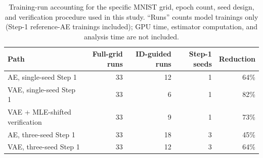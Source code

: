 \documentclass[make,article,submit,pdftex,moreauthors]{Definitions/mdpi}
\begin{document}
\begin{table}[H]
\caption{Training-run accounting for the specific MNIST grid, epoch count,
seed design, and verification procedure used in this study. ``Runs''
counts model trainings only (Step-1 reference-AE trainings included); GPU
time, estimator computation, and analysis time are not included.}
\label{tab:cost}
\small
\begin{tabular}{lrrrr}
\toprule
\textbf{Path} & \textbf{Full-grid runs} & \textbf{ID-guided runs} & \textbf{Step-1 seeds} & \textbf{Reduction} \\
\midrule
AE, single-seed Step 1 & 33 & 12 & 1 & 64\% \\
VAE, single-seed Step 1 & 33 & 6 & 1 & 82\% \\
VAE + MLE-shifted verification & 33 & 9 & 1 & 73\% \\
AE, three-seed Step 1 & 33 & 18 & 3 & 45\% \\
VAE, three-seed Step 1 & 33 & 12 & 3 & 64\% \\
\bottomrule
\end{tabular}
\end{table}
\end{document}
